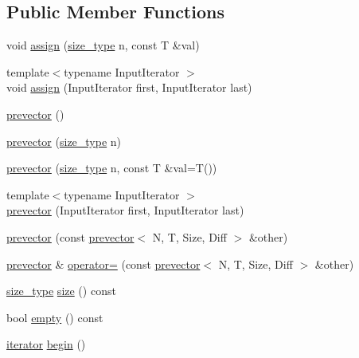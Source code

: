 \subsection*{Public Member Functions}
\begin{DoxyCompactItemize}
\item 
void \mbox{\hyperlink{classprevector_aecbf4de43de23c1b01a2e39bf974f14e}{assign}} (\mbox{\hyperlink{classprevector_a7e0da95e6d1c878f6eeb572f4fc12524}{size\+\_\+type}} n, const T \&val)
\item 
{\footnotesize template$<$typename Input\+Iterator $>$ }\\void \mbox{\hyperlink{classprevector_a8bb8dd8d722522a475b6a36bc93cd8c1}{assign}} (Input\+Iterator first, Input\+Iterator last)
\item 
\mbox{\hyperlink{classprevector_a176a8db0d60ddd8cfc3ea70413f7c1c0}{prevector}} ()
\item 
\mbox{\hyperlink{classprevector_a0c428e879c43daac251d6fbbc2ab7b54}{prevector}} (\mbox{\hyperlink{classprevector_a7e0da95e6d1c878f6eeb572f4fc12524}{size\+\_\+type}} n)
\item 
\mbox{\hyperlink{classprevector_a044c7d0d417476bb08cc8c9b33755cac}{prevector}} (\mbox{\hyperlink{classprevector_a7e0da95e6d1c878f6eeb572f4fc12524}{size\+\_\+type}} n, const T \&val=T())
\item 
{\footnotesize template$<$typename Input\+Iterator $>$ }\\\mbox{\hyperlink{classprevector_a1f97e987163b5d6525168ed8e4229fe9}{prevector}} (Input\+Iterator first, Input\+Iterator last)
\item 
\mbox{\hyperlink{classprevector_abab195dce86a4b44bab7a5e9809a522c}{prevector}} (const \mbox{\hyperlink{classprevector}{prevector}}$<$ N, T, Size, Diff $>$ \&other)
\item 
\mbox{\hyperlink{classprevector}{prevector}} \& \mbox{\hyperlink{classprevector_a325af27672f21e7f2a01d8cdae7abba8}{operator=}} (const \mbox{\hyperlink{classprevector}{prevector}}$<$ N, T, Size, Diff $>$ \&other)
\item 
\mbox{\hyperlink{classprevector_a7e0da95e6d1c878f6eeb572f4fc12524}{size\+\_\+type}} \mbox{\hyperlink{classprevector_a626f7d206dbc24e5610631809762758b}{size}} () const
\item 
bool \mbox{\hyperlink{classprevector_a0057a2d5ac2bbff636af5fbd87ae5235}{empty}} () const
\item 
\mbox{\hyperlink{classprevector_1_1iterator}{iterator}} \mbox{\hyperlink{classprevector_aa9210cbe708412a70868d6e0bca844c9}{begin}} ()

\end{DoxyCompactItemize}
